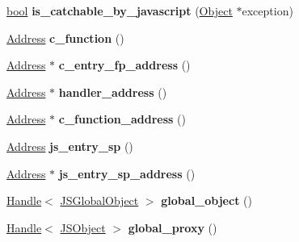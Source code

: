 \begin{DoxyCompactItemize}
\mbox{\hyperlink{classbool}{bool}} {\bfseries is\+\_\+catchable\+\_\+by\+\_\+javascript} (\mbox{\hyperlink{classv8_1_1internal_1_1Object}{Object}} $\ast$exception)
\item 
\mbox{\label{classv8_1_1internal_1_1Isolate_ae9563da6158eacde1c49fa8a8147d38c}} 
\mbox{\hyperlink{classuintptr__t}{Address}} {\bfseries c\+\_\+function} ()
\item 
\mbox{\label{classv8_1_1internal_1_1Isolate_ae9cbe69b7bfa733e978bd2a83b4006a8}} 
\mbox{\hyperlink{classuintptr__t}{Address}} $\ast$ {\bfseries c\+\_\+entry\+\_\+fp\+\_\+address} ()
\item 
\mbox{\label{classv8_1_1internal_1_1Isolate_ad75476b8c6f76f3bb98257d48e578038}} 
\mbox{\hyperlink{classuintptr__t}{Address}} $\ast$ {\bfseries handler\+\_\+address} ()
\item 
\mbox{\label{classv8_1_1internal_1_1Isolate_a1ff131c9bfa1cf7ff26e7d61eddcdad5}} 
\mbox{\hyperlink{classuintptr__t}{Address}} $\ast$ {\bfseries c\+\_\+function\+\_\+address} ()
\item 
\mbox{\label{classv8_1_1internal_1_1Isolate_a845886f051b159999c67dcba918b1154}} 
\mbox{\hyperlink{classuintptr__t}{Address}} {\bfseries js\+\_\+entry\+\_\+sp} ()
\item 
\mbox{\label{classv8_1_1internal_1_1Isolate_a1eb1d6e55ff7cfab3c696e16447fdde9}} 
\mbox{\hyperlink{classuintptr__t}{Address}} $\ast$ {\bfseries js\+\_\+entry\+\_\+sp\+\_\+address} ()
\item 
\mbox{\label{classv8_1_1internal_1_1Isolate_a02fd172ef4a5caf9b5ce7d9794f79510}} 
\mbox{\hyperlink{classv8_1_1internal_1_1Handle}{Handle}}$<$ \mbox{\hyperlink{classv8_1_1internal_1_1JSGlobalObject}{J\+S\+Global\+Object}} $>$ {\bfseries global\+\_\+object} ()
\item 
\mbox{\label{classv8_1_1internal_1_1Isolate_a53938a796d056ccec2ce60d60448228c}} 
\mbox{\hyperlink{classv8_1_1internal_1_1Handle}{Handle}}$<$ \mbox{\hyperlink{classv8_1_1internal_1_1JSObject}{J\+S\+Object}} $>$ {\bfseries global\+\_\+proxy} ()

\end{DoxyCompactItemize}
